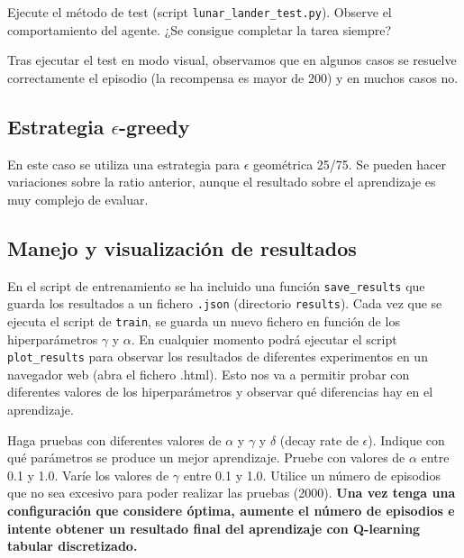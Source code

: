 \documentclass{article}
\begin{document}
\begin{exercise}
    Ejecute el método de test (script \texttt{lunar\_lander\_test.py}). Observe el comportamiento del agente. ¿Se consigue completar la tarea siempre?
\end{exercise}
Tras ejecutar el test en modo visual, observamos que en algunos casos se resuelve correctamente el episodio (la recompensa es mayor de 200) y en muchos casos no.

\subsection{Estrategia $\epsilon$-greedy}
En este caso se utiliza una estrategia para $\epsilon$ geométrica 25/75. Se pueden hacer variaciones sobre la ratio anterior, aunque el resultado sobre el aprendizaje es muy complejo de evaluar.



\subsection{Manejo y visualización de resultados}
En el script de entrenamiento se ha incluido una función \texttt{save\_results} que guarda los resultados a un fichero \texttt{.json} (directorio \texttt{results}). Cada vez que se ejecuta el script de \texttt{train}, se guarda un nuevo fichero en función de los hiperparámetros $\gamma$ y $\alpha$. En cualquier momento podrá ejecutar el script \texttt{plot\_results} para observar los resultados de diferentes experimentos en un navegador web (abra el fichero .html). Esto nos va a permitir probar con diferentes valores de los hiperparámetros y observar qué diferencias hay en el aprendizaje.

\begin{exercise}
Haga pruebas con diferentes valores de $\alpha$ y $\gamma$ y $\delta$ (decay rate de $\epsilon$). Indique con qué parámetros se produce un mejor aprendizaje. Pruebe con valores de $\alpha$ entre 0.1 y 1.0. Varíe los valores de $\gamma$ entre 0.1 y 1.0. Utilice un número de episodios que no sea excesivo para poder realizar las pruebas (2000). \textbf{Una vez tenga una configuración que considere óptima, aumente el número de episodios e intente obtener un resultado final del aprendizaje con Q-learning tabular discretizado.}
\end{exercise}
\end{document}
